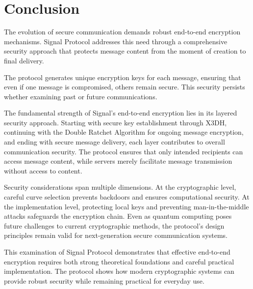 \documentclass[9pt,a4paper,twoside]{rho-class/rho}
\begin{document}
\section{Conclusion}
The evolution of secure communication demands robust end-to-end encryption mechanisms. Signal Protocol addresses this need through a comprehensive security approach that protects message content from the moment of creation to final delivery.

 The protocol generates unique encryption keys for each message, ensuring that even if one message is compromised, others remain secure. This security persists whether examining past or future communications.
 
The fundamental strength of Signal's end-to-end encryption lies in its layered security approach. Starting with secure key establishment through X3DH, continuing with the Double Ratchet Algorithm for ongoing message encryption, and ending with secure message delivery, each layer contributes to overall communication security. The protocol ensures that only intended recipients can access message content, while servers merely facilitate message transmission without access to content.

Security considerations span multiple dimensions. At the cryptographic level, careful curve selection prevents backdoors and ensures computational security. At the implementation level, protecting local keys and preventing man-in-the-middle attacks safeguards the encryption chain. Even as quantum computing poses future challenges to current cryptographic methods, the protocol's design principles remain valid for next-generation secure communication systems.

This examination of Signal Protocol demonstrates that effective end-to-end encryption requires both strong theoretical foundations and careful practical implementation. The protocol shows how modern cryptographic systems can provide robust security while remaining practical for everyday use.


\printbibliography

\end{document}
